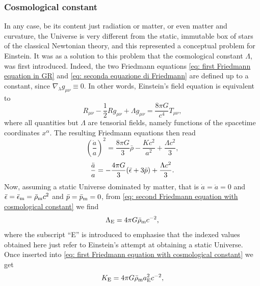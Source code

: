 \subsubsection{Cosmological constant}
In any case, be its content just radiation or matter, or even matter and curvature, the Universe is very different from the static, immutable box of stars of the classical Newtonian theory, and this represented a conceptual problem for Einstein. It was as a solution to this problem that the cosmological constant $\Lambda$, was first introduced. Indeed, the two Friedmann equations \eqref{eq: first Friedmann equation in GR} and \eqref{eq: seconda equazione di Friedmann} are defined up to a constant, since $\nabla_{\lambda}g_{\mu\nu} \equiv 0$. In other words, Einstein's field equation is equivalent to
\begin{equation}
    R_{\mu\nu} - \frac{1}{2} R g_{\mu\nu} + \Lambda g_{\mu\nu} = \frac{8\pi G}{c^4} T_{\mu\nu},
\end{equation}
where all quantities but $\Lambda$ are tensorial fields, namely functions of the spacetime coordinates $x^\alpha$. The resulting Friedmann equations then read
\begin{equation}
\label{eq: first Friedmann equation with cosmological constant}
    \left(\frac{\dot{a}}{a}\right)^2 = \frac{8\pi G}{3} \bar{\rho} - \frac{K c^2}{a^2} + \frac{\Lambda c^2}{3} ,
\end{equation}
\begin{equation}
\label{eq: second Friedmann equation with cosmological constant}
    \frac{\ddot{a}}{a} = -\frac{4\pi G}{3} (\bar{\epsilon} + 3\bar{p}) + \frac{\Lambda c^2}{3} .
\end{equation}
Now, assuming a static Universe dominated by matter, that is $\dot{a} = \ddot{a} = 0$ and $\bar{\epsilon} = \bar{\epsilon}_{\mathrm{m}} = \bar{\rho}_{\mathrm{m}} c^2$ and $\bar{p} = \bar{p}_{\mathrm{m}} = 0$, from \eqref{eq: second Friedmann equation with cosmological constant} we find
\begin{equation}
    \Lambda_{\mathrm{E}} = 4\pi G \bar{\rho}_{\mathrm{m}} c^{-2} ,
\end{equation}
where the subscript ``E'' is introduced to emphasise that the indexed values obtained here just refer to Einstein's attempt at obtaining a static Universe. Once inserted into \eqref{eq: first Friedmann equation with cosmological constant} we get
\begin{equation}
    K_{\mathrm{E}} = 4\pi G \bar{\rho}_{\mathrm{m}} a_{\mathrm{E}}^2 c^{-2} ,
\end{equation}
